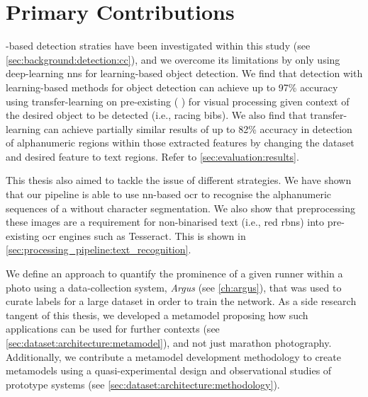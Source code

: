 \section{Primary Contributions}

-based detection straties have been investigated within this study  (see \cref{sec:background:detection:cc}), and we overcome its limitations by only using deep-learning \glspl{nn} for learning-based object detection. We find that detection with learning-based methods for object detection can achieve up to 97\% accuracy using transfer-learning on pre-existing  (\frcnn{} \citep{Ren:2017ug}) for visual processing given context of the desired object to be detected (i.e., racing bibs). We also find that transfer-learning can achieve partially similar results of up to 82\% accuracy in detection of alphanumeric regions within those extracted features by changing the dataset and desired feature to text regions. Refer to \cref{sec:evaluation:results}.

This thesis also aimed to tackle the issue of different  strategies. We have shown that our pipeline is able to use \gls{nn}-based \gls{ocr} to recognise the alphanumeric sequences of a  without character segmentation. We also show that preprocessing these images are a requirement for non-binarised text (i.e., red \glspl{rbn}) into pre-existing \gls{ocr} engines such as Tesseract. This is shown in \cref{sec:processing_pipeline:text_recognition}.

We define an approach to quantify the prominence of a given runner within a photo using a data-collection system, \textit{Argus} (see \cref{ch:argus}), that was used to curate labels for a large dataset in order to train the network. As a side research tangent of this thesis, we developed a metamodel proposing how such applications can be used for further contexts (see \cref{sec:dataset:architecture:metamodel}), and not just marathon photography. Additionally, we contribute a metamodel development methodology to create metamodels using a quasi-experimental design and observational studies of prototype systems (see \cref{sec:dataset:architecture:methodology}).


